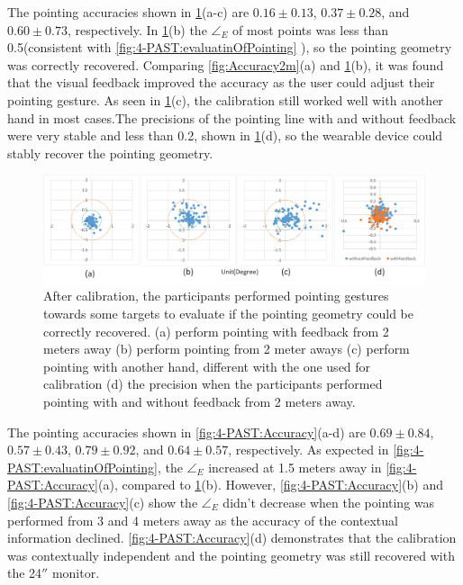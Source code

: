 The pointing accuracies shown in \figurename{ \ref{fig:4-PAST:Accuracy2m}(a-c)} are $0.16\pm0.13$\degree, $0.37\pm0.28$\degree, and $0.60\pm0.73$\degree, respectively.  In \figurename{ \ref{fig:4-PAST:Accuracy2m}(b)} the ${\angle}_{E}$ of most points was less than 0.5\degree (consistent with  \figurename{ \ref{fig:4-PAST:evaluatinOfPointing}} ), so the pointing geometry was correctly recovered. Comparing \figurename{ \ref{fig:Accuracy2m}(a) and \ref{fig:4-PAST:Accuracy2m}(b)}, it was found that the visual feedback improved the accuracy as the user could adjust their pointing gesture. As seen in \figurename{ \ref{fig:4-PAST:Accuracy2m}(c)}, the calibration still worked well with another hand in most cases.The precisions of the pointing line with and without feedback were very stable and less than 0.2\degree, shown in \figurename{ \ref{fig:4-PAST:Accuracy2m}(d)}, so the wearable device could stably recover the pointing geometry.
\begin{figure} [htb]
	\centering
	\includegraphics[width=\linewidth]{figures/4-PAST/accuracy2m.png}
	\caption{After calibration, the participants performed pointing gestures towards some targets to evaluate if the pointing geometry could be correctly recovered. (a) perform pointing with feedback from 2 meters away (b) perform pointing from 2 meter aways (c) perform pointing with another hand, different with the one used for calibration (d) the precision when the participants performed pointing with and without feedback from 2 meters away.}
	\label{fig:4-PAST:Accuracy2m}
\end{figure}

The pointing accuracies shown in \figurename{ \ref{fig:4-PAST:Accuracy}(a-d)} are $0.69\pm0.84$\degree, $0.57\pm0.43$\degree, $0.79\pm0.92$\degree, and $0.64\pm0.57$\degree, respectively. As expected in \figurename{ \ref{fig:4-PAST:evaluatinOfPointing}}, the ${\angle}_{E}$ increased at 1.5 meters away in \figurename{ \ref{fig:4-PAST:Accuracy}(a)}, compared to \figurename{ \ref{fig:4-PAST:Accuracy2m}(b)}. However, \figurename{ \ref{fig:4-PAST:Accuracy}(b) and \ref{fig:4-PAST:Accuracy}(c)} show the ${\angle}_{E}$ didn't decrease when the pointing was performed from 3 and 4 meters away as the accuracy of the contextual information declined. \figurename{ \ref{fig:4-PAST:Accuracy}(d)} demonstrates that the calibration was contextually independent and the pointing geometry was still recovered with the 24$''$ monitor. 


